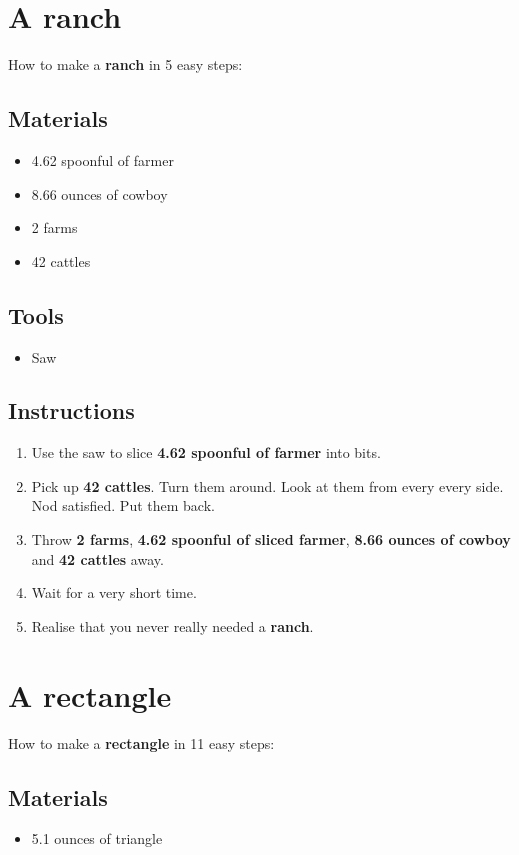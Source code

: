 \documentclass{article}
\begin{document}
\section{A ranch}How to make a \textbf{ranch} in 5 easy steps:

\subsection{Materials}\begin{itemize}
\item 
4.62 spoonful of farmer
\item 
8.66 ounces of cowboy
\item 
2 farms
\item 
42 cattles
\end{itemize}
\subsection{Tools}\begin{itemize}
\item 
Saw
\end{itemize}
\subsection{Instructions}\begin{enumerate}
\item 
Use the saw to slice \textbf{4.62 spoonful of farmer} into bits.
\item 
Pick up \textbf{42 cattles}. Turn them around. Look at them from every every side. Nod satisfied. Put them back.
\item 
Throw \textbf{2 farms}, \textbf{4.62 spoonful of sliced farmer}, \textbf{8.66 ounces of cowboy} and \textbf{42 cattles} away.
\item 
Wait for a very short time.
\item 
Realise that you never really needed a \textbf{ranch}.
\end{enumerate}
\newpage
\section{A rectangle}How to make a \textbf{rectangle} in 11 easy steps:

\subsection{Materials}\begin{itemize}
\item 
5.1 ounces of triangle
\end{itemize}
\end{document}
